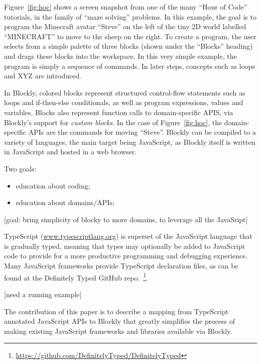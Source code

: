 Figure~\ref{fig:hoc} shows a screen snapshot from one of the many 
``Hour of Code'' tutorials, in the family of ``maze solving'' problems.
In this example, the goal is to program the Minecraft avatar ``Steve''
on the left of the tiny 2D world labelled ``MINECRAFT''
to move to the sheep on the right. To create a program,
the user selects from a simple palette of three blocks
(shown under the ``Blocks'' heading) and drags these blocks into
the workspace. In this very simple example, the
program is simply a sequence of commands. In later steps, 
concepts such as loops and XYZ are introduced.

In Blockly, colored blocks represent structured control-flow statements such as loops 
and if-then-else conditionals, as well as program expressions, values and variables. 
Blocks also represent function calls to domain-specific APIS, via Blockly's support 
for \emph{custom 
blocks}.  In the case of Figure~\ref{fig:hoc}, the domain-specific APIs are the commands
for moving ``Steve''.
Blockly can be compiled to a variety of languages, the main target 
being JavaScript, as Blockly itself is written in JavaScript 
and hosted in a web browser.


Two goals: 
\begin{itemize}
    \item education about coding; 
    \item education about domains/APIs;
\end{itemize}


[goal: bring simplicity of blocky to more domains, to leverage all the JavaSript]

TypeScript (\url{www.typescriptlang.org}) is superset of the JavaScript language that is gradually typed, 
meaning that types may optionally be added to JavaScript code to provide for a more productive programming 
and debugging experience.  Many JavaScript frameworks provide TypeScript declaration files, as
can be found at the Definitely Typed GitHub repo.~\footnote{\url{https://github.com/DefinitelyTyped/DefinitelyTyped}}.

[need a running example]

The contribution of this paper is to describe a mapping from TypeScript annotated 
JavaScript APIs to Blockly that greatly simplifies 
the process of making existing JavaScript frameworks and libraries available via Blockly.

